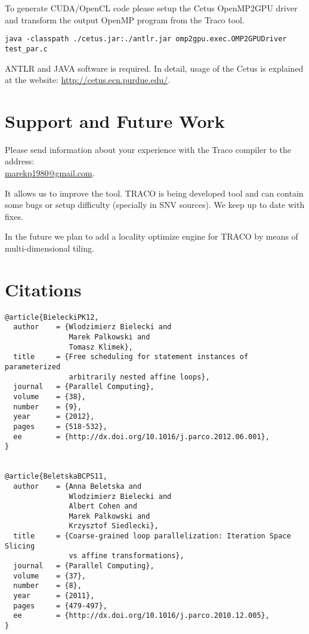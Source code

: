 \documentclass[a4paper,12pt]{book}
\begin{document}
To generate CUDA/OpenCL code please setup the Cetus OpenMP2GPU driver \cite{cetus} and transform the output OpenMP program from the Traco tool. 

\small
\begin{verbatim}
java -classpath ./cetus.jar:./antlr.jar omp2gpu.exec.OMP2GPUDriver test_par.c
\end{verbatim}
\normalsize

ANTLR and JAVA software is required. In detail, usage of the Cetus is explained at the website: \url{http://cetus.ecn.purdue.edu/}.

\section{Support and Future Work}

Please send information about your experience with the Traco compiler to the address:\\
 \url{marekp1980@gmail.com}. 
 
It allows us to improve the tool. TRACO is being developed tool and can contain some bugs or setup difficulty (specially in SNV sources). We keep up to date with fixes.

In the future we plan to add a locality optimize engine for TRACO by means of multi-dimensional tiling. 

\section{Citations}
\small
\begin{verbatim}
@article{BieleckiPK12,
  author    = {Wlodzimierz Bielecki and
               Marek Palkowski and
               Tomasz Klimek},
  title     = {Free scheduling for statement instances of parameterized
               arbitrarily nested affine loops},
  journal   = {Parallel Computing},
  volume    = {38},
  number    = {9},
  year      = {2012},
  pages     = {518-532},
  ee        = {http://dx.doi.org/10.1016/j.parco.2012.06.001},
}


@article{BeletskaBCPS11,
  author    = {Anna Beletska and
               Wlodzimierz Bielecki and
               Albert Cohen and
               Marek Palkowski and
               Krzysztof Siedlecki},
  title     = {Coarse-grained loop parallelization: Iteration Space Slicing
               vs affine transformations},
  journal   = {Parallel Computing},
  volume    = {37},
  number    = {8},
  year      = {2011},
  pages     = {479-497},
  ee        = {http://dx.doi.org/10.1016/j.parco.2010.12.005},
}

\end{verbatim}
\normalsize
\let\cleardoublepage\clearpage
\end{document}
